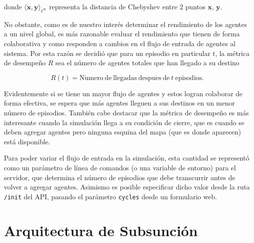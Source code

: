 \documentclass[twoside,11pt]{article}
\begin{document}
donde $\langle \bm{x}, \bm{y}\rangle_{\ell^{\infty}}$ representa la distancia de Chebyshev entre 2
puntos $\bm{x}$, $\bm{y}$.

No obstante, como es de nuestro interés determinar el rendimiento de los agentes a un nivel global, es más
razonable evaluar el rendimiento que tienen de forma colaborativa y como responden a cambios en el flujo de
entrada de agentes al sistema. Por esta razón se decidió que para un episodio en particular $t$, la métrica de desempeño $R$
sea el número de agentes totales que han llegado a su destino

\begin{equation}\label{eq:metric}
  R(t) = \mathrm{N\acute{u}mero \ de \ llegadas \ despu\acute{e}s \ de \ } t \ \mathrm{episodios}.
\end{equation}

Evidentemente si se tiene un mayor flujo de agentes y estos logran colaborar de forma efectiva, se espera que
más agentes lleguen a sus destinos en un menor número de episodios. También cabe destacar que la métrica de desempeño
es más interesante cuando la simulación llega a su condición de cierre, que es cuando se deben agregar agentes pero ninguna esquina
del mapa (que es donde aparecen) está disponible.

Para poder variar el flujo de entrada en la simulación, esta cantidad se representó como un parámetro de línea de comandos (o una variable de entorno) 
para el servidor, que determina el número de episodios que debe transcurrir antes de volver a agregar agentes. Asimismo es posible especificar
dicho valor desde la ruta {\tt{/init}} del API, pasando el parámetro {\tt{cycles}} desde un formulario web.

\section{Arquitectura de Subsunción}\label{sec:arch}
\end{document}
